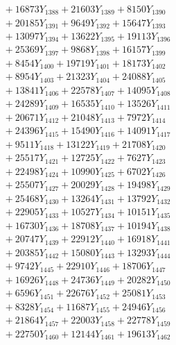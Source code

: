 \documentclass[a4paper,10pt]{article}
\begin{document}
{\begin{align}
&\;  + 16873 Y_{1388} + 21603 Y_{1389} + 8150 Y_{1390} \\[0.3ex]
&\;  + 20185 Y_{1391} + 9649 Y_{1392} + 15647 Y_{1393} \\[0.3ex]
&\;  + 13097 Y_{1394} + 13622 Y_{1395} + 19113 Y_{1396} \\[0.3ex]
&\;  + 25369 Y_{1397} + 9868 Y_{1398} + 16157 Y_{1399} \\[0.3ex]
&\;  + 8454 Y_{1400} + 19719 Y_{1401} + 18173 Y_{1402} \\[0.3ex]
&\;  + 8954 Y_{1403} + 21323 Y_{1404} + 24088 Y_{1405} \\[0.3ex]
&\;  + 13841 Y_{1406} + 22578 Y_{1407} + 14095 Y_{1408} \\[0.5ex]\allowbreak
&\;  + 24289 Y_{1409} + 16535 Y_{1410} + 13526 Y_{1411} \\[0.3ex]
&\;  + 20671 Y_{1412} + 21048 Y_{1413} + 7972 Y_{1414} \\[0.3ex]
&\;  + 24396 Y_{1415} + 15490 Y_{1416} + 14091 Y_{1417} \\[0.3ex]
&\;  + 9511 Y_{1418} + 13122 Y_{1419} + 21708 Y_{1420} \\[0.3ex]
&\;  + 25517 Y_{1421} + 12725 Y_{1422} + 7627 Y_{1423} \\[0.3ex]
&\;  + 22498 Y_{1424} + 10990 Y_{1425} + 6702 Y_{1426} \\[0.3ex]
&\;  + 25507 Y_{1427} + 20029 Y_{1428} + 19498 Y_{1429} \\[0.3ex]
&\;  + 25468 Y_{1430} + 13264 Y_{1431} + 13792 Y_{1432} \\[0.3ex]
&\;  + 22905 Y_{1433} + 10527 Y_{1434} + 10151 Y_{1435} \\[0.3ex]
&\;  + 16730 Y_{1436} + 18708 Y_{1437} + 10194 Y_{1438} \\[0.5ex]\allowbreak
&\;  + 20747 Y_{1439} + 22912 Y_{1440} + 16918 Y_{1441} \\[0.3ex]
&\;  + 20385 Y_{1442} + 15080 Y_{1443} + 13293 Y_{1444} \\[0.3ex]
&\;  + 9742 Y_{1445} + 22910 Y_{1446} + 18706 Y_{1447} \\[0.3ex]
&\;  + 16926 Y_{1448} + 24736 Y_{1449} + 20282 Y_{1450} \\[0.3ex]
&\;  + 6596 Y_{1451} + 22676 Y_{1452} + 25081 Y_{1453} \\[0.3ex]
&\;  + 8328 Y_{1454} + 11687 Y_{1455} + 24946 Y_{1456} \\[0.3ex]
&\;  + 21864 Y_{1457} + 22003 Y_{1458} + 22778 Y_{1459} \\[0.3ex]
&\;  + 22750 Y_{1460} + 12144 Y_{1461} + 19613 Y_{1462} \\[0.3ex]

\end{align}}
\end{document}
